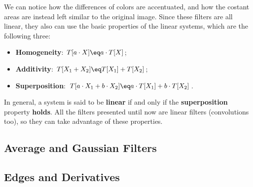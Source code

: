 \begin{center}
\end{center}

We can notice how the differences of colors are accentuated, and how the costant areas are instead left similar to the original image.
\nl
Since these filters are all linear, they also can use the basic properties of the linear systems, which are the following three:
\begin{itemize}
    \item \textbf{Homogeneity}: $T[a \cdot X] \eq a \cdot T[X]$;
    \item \textbf{Additivity}: $T[X_1 + X_2] \eq T[X_1] + T[X_2]$;
    \item \textbf{Superposition}: $T[a \cdot X_1 + b \cdot X_2] \eq a \cdot T[X_1] + b \cdot T[X_2]$.
\end{itemize}

In general, a system is said to be \textbf{linear} if and only if the \textbf{superposition} property \textbf{holds}. All the filters presented until now are linear filters (convolutions too), so they can take advantage of these properties.

\subsection{Average and Gaussian Filters}

\subsection{Edges and Derivatives}